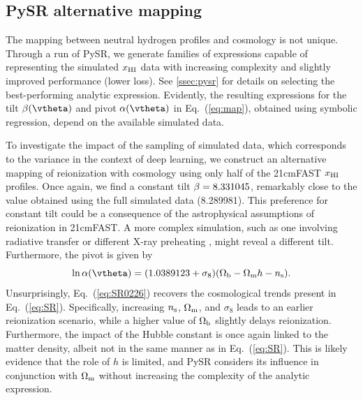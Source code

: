 \subsection*{PySR alternative mapping}
\label{ssec:0226}

The mapping between neutral hydrogen profiles and cosmology is not
unique.
Through a run of PySR,  we generate families of expressions capable of
representing the simulated $x_{\mathrm{HI}}$ data with increasing complexity and
slightly improved performance (lower loss).
See \ref{ssec:pysr} for details on selecting the best-performing
analytic expression.
Evidently, the resulting expressions for the tilt $\tilt(\vtheta)$ and
pivot $\ap(\vtheta)$ in Eq.~(\ref{eq:map}), obtained using symbolic
regression, depend on the available simulated data.

To investigate the impact of the sampling of simulated data, which
corresponds to the variance in the context of deep learning, we
construct an alternative mapping of reionization with cosmology using
only half of the 21cmFAST $x_{\mathrm{HI}}$ profiles.
Once again, we find a constant tilt $\beta = 8.331045$, remarkably close
to the value obtained using the full simulated data (8.289981).
This preference for constant tilt could be a consequence of the
astrophysical assumptions of reionization in 21cmFAST.
A more complex simulation, such as one involving radiative transfer or
different X-ray preheating \cite{Montero2024}, might reveal a different
tilt.
Furthermore, the pivot is given by
%
\begin{equation}
\label{eq:SR0226}
\ln\ap(\vtheta) = (1.0389123 + \sigma_8) (\Omegab - \Omegam h  - \ns).
\end{equation}
%
Unsurprisingly, Eq.~(\ref{eq:SR0226}) recovers the cosmological trends
present in Eq.~(\ref{eq:SR}).
Specifically, increasing $n_\mathrm{s}$, $\Omega_\mathrm{m}$, and $\sigma_8$ leads to an
earlier reionization scenario, while a higher value of $\Omega_\mathrm{b}$
slightly delays reionization.
Furthermore, the impact of the Hubble constant is once again linked to
the matter density, albeit not in the same manner as in
Eq.~(\ref{eq:SR}).
This is likely evidence that the role of $h$ is limited, and PySR
considers its influence in conjunction with $\Omega_\mathrm{m}$ without increasing
the complexity of the analytic expression.

